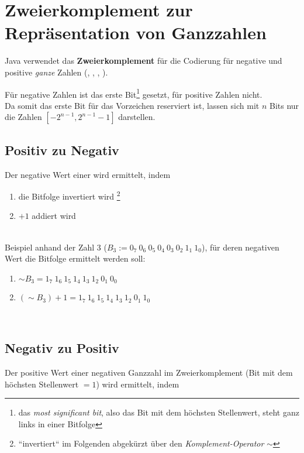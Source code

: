 \section{Zweierkomplement zur Repräsentation von Ganzzahlen}


Java verwendet das \textbf{Zweierkomplement} für die Codierung für negative und positive \textit{ganze} Zahlen (, , , ).

\noindent
Für negative Zahlen ist das erste Bit\footnote{
    das \textit{most significant bit}, also das Bit mit dem höchsten Stellenwert, steht ganz links in einer Bitfolge
} gesetzt, für positive Zahlen nicht.\\
Da somit das erste Bit für das Vorzeichen reserviert ist, lassen sich mit $n$ Bits nur die Zahlen $[-2^{n-1}, 2^{n-1} -1]$ darstellen.\\


\subsection*{Positiv zu Negativ}
Der negative Wert einer wird ermittelt, indem

\begin{enumerate}
    \item die Bitfolge invertiert wird \footnote{``invertiert`` im Folgenden abgekürzt über den \textit{Komplement-Operator} $\sim$}
    \item $+1$ addiert wird
\end{enumerate}\\

\noindent
Beispiel anhand der Zahl $3$ ($B_{3}:= 0_7\ 0_6\ 0_5\ 0_4\ 0_3\ 0_2\ 1_1\ 1_0$), für deren negativen Wert die Bitfolge ermittelt werden soll:

\begin{enumerate}
    \item $\sim B_{3} = 1_7\ 1_6\ 1_5\ 1_4\ 1_3\ 1_2\ 0_1\ 0_0$
    \item $(\sim B_{3}) + 1 = 1_7\ 1_6\ 1_5\ 1_4\ 1_3\ 1_2\ 0_1\ 1_0$
\end{enumerate}\\


\subsection*{Negativ zu Positiv}
Der positive Wert einer negativen Ganzzahl im Zweierkomplement (Bit mit dem höchsten Stellenwert $=1$) wird ermittelt, indem

